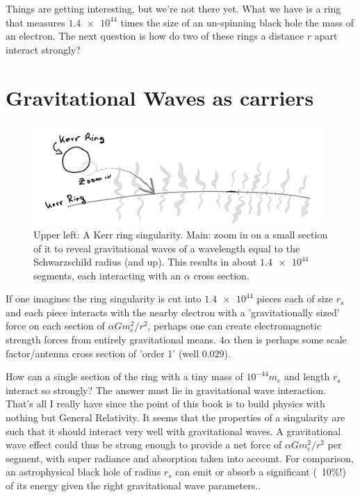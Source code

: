 \documentclass[../rzero]{subfiles}
\begin{document}
Things are getting interesting, but we're not there yet. What we have is a ring that measures $\num{1.4e44}$ times the size of an un-spinning black hole the mass of an electron. The next question is how do two of these rings a distance $r$ apart interact strongly?


\section{Gravitational Waves as carriers}

\begin{figure}\label{kerr-electric-image}
\includegraphics[width=0.99\textwidth]{chapters/images/kerr-electric.png}
\caption{Upper left: A Kerr ring singularity. Main: zoom in on a small section of it to reveal gravitational waves of a wavelength equal to the Schwarzschild radius (and up). This results in about $\num{1.4e44}$ segments, each interacting with an $\alpha$ cross section.}
\end{figure}



 If one imagines the ring singularity is cut into $\num{1.4e44} $ pieces each of size $r_s$ and each piece interacts with the nearby electron with a 'gravitationally sized' force on each section of $\alpha G m_e^2/r^2 $, perhaps one can create electromagnetic strength forces from entirely gravitational means. $4\alpha$ then is perhaps some scale factor/antenna cross section of 'order 1' (well $ 0.029$).
   
 How can a single section of the ring with a tiny mass of $ 10^{-44}m_e $ and length $r_s$ interact so strongly? The answer must lie in gravitational wave interaction. That's all I really have since the point of this book is to build physics with nothing but General Relativity.  It seems that the properties of a singularity are such that it should interact very well\cite{Nakamura1993} with gravitational waves. A gravitational wave effect could thus be strong enough to provide a net force of $\alpha G m_e^2/r^2 $ per segment, with super radiance and absorption taken into account. For comparison, an astrophysical black hole of radius $r_s$ can emit or absorb a significant (~10\%!) of its energy given the right gravitational wave parameters.\cite{Brito2015}.  
  
\end{document}
